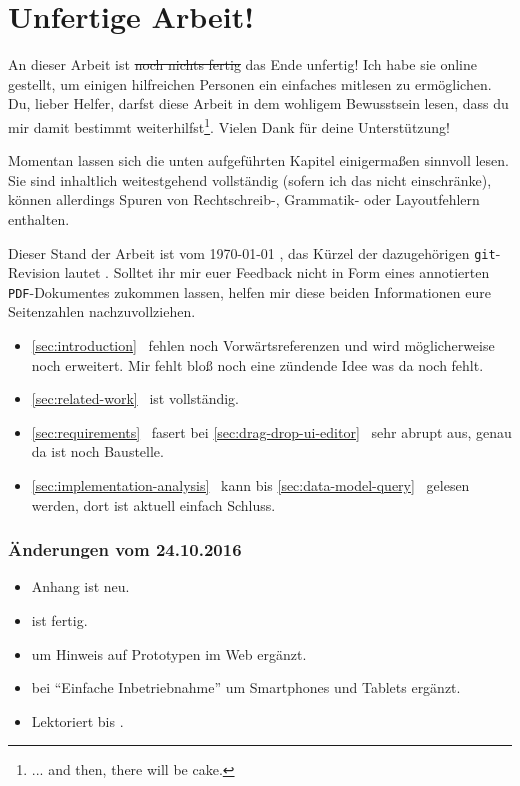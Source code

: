 \documentclass[paper=a4,fontsize=12pt,parskip=half,twoside]{scrartcl}
\title{\doctitle}
\subtitle{\docsubtitle}
\author{\docauthors}
\date{\today{}}
\begin{document}


\newpage

\section*{Unfertige Arbeit!}

An dieser Arbeit ist \sout{noch nichts fertig} das Ende unfertig! Ich habe sie online gestellt, um einigen hilfreichen Personen ein einfaches mitlesen zu ermöglichen. Du, lieber Helfer, darfst diese Arbeit in dem wohligem Bewusstsein lesen, dass du mir damit bestimmt weiterhilfst\footnote{... and then, there will be cake.}. Vielen Dank für deine Unterstützung!

Momentan lassen sich die unten aufgeführten Kapitel einigermaßen sinnvoll lesen. Sie sind inhaltlich weitestgehend vollständig (sofern ich das nicht einschränke), können allerdings Spuren von Rechtschreib-, Grammatik- oder Layoutfehlern enthalten.

Dieser Stand der Arbeit ist vom \today{} \currenttime{}, das Kürzel der dazugehörigen \texttt{git}-Revision lautet \texttt{}. Solltet ihr mir euer Feedback nicht in Form eines annotierten \texttt{PDF}-Dokumentes zukommen lassen, helfen mir diese beiden Informationen eure Seitenzahlen nachzuvollziehen.

\begin{itemize}[noitemsep]
\item \ref{sec:introduction}~ fehlen noch Vorwärtsreferenzen und wird möglicherweise noch erweitert. Mir fehlt bloß noch eine zündende Idee was da noch fehlt.
\item \ref{sec:related-work}~ ist vollständig.
\item \ref{sec:requirements}~ fasert bei \ref{sec:drag-drop-ui-editor}~ sehr abrupt aus, genau da ist noch Baustelle.
\item \ref{sec:implementation-analysis}~ kann bis \ref{sec:data-model-query}~ gelesen werden, dort ist aktuell einfach Schluss.
\end{itemize}

\subsubsection*{Änderungen vom 24.10.2016}
\begin{itemize}[noitemsep]
\item Anhang  ist neu.
\item {} ist fertig.
\item {} um Hinweis auf Prototypen im Web ergänzt.
\item {} bei "`Einfache Inbetriebnahme"' um Smartphones und Tablets ergänzt.
\item Lektoriert bis .
\end{itemize}
\end{document}
